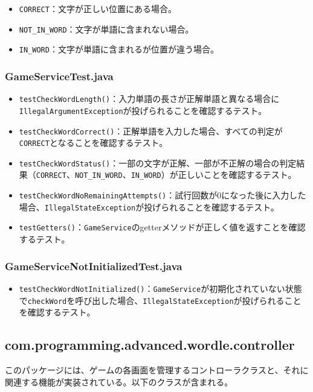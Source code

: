 \documentclass[a4j]{ujarticle}
\begin{document}
\begin{itemize}
  \item \texttt{CORRECT}：文字が正しい位置にある場合。
  \item \texttt{NOT\_IN\_WORD}：文字が単語に含まれない場合。
  \item \texttt{IN\_WORD}：文字が単語に含まれるが位置が違う場合。
\end{itemize}

\subsubsection{GameServiceTest.java}

\begin{itemize}
  \item \texttt{testCheckWordLength()}：入力単語の長さが正解単語と異なる場合に\texttt{IllegalArgumentException}が投げられることを確認するテスト。
  \item \texttt{testCheckWordCorrect()}：正解単語を入力した場合、すべての判定が\texttt{CORRECT}となることを確認するテスト。
  \item \texttt{testCheckWordStatus()}：一部の文字が正解、一部が不正解の場合の判定結果（\texttt{CORRECT}、\texttt{NOT\_IN\_WORD}、\texttt{IN\_WORD}）が正しいことを確認するテスト。
  \item \texttt{testCheckWordNoRemainingAttempts()}：試行回数が0になった後に入力した場合、\texttt{IllegalStateException}が投げられることを確認するテスト。
  \item \texttt{testGetters()}：\texttt{GameService}のgetterメソッドが正しく値を返すことを確認するテスト。
\end{itemize}

\subsubsection{GameServiceNotInitializedTest.java}

\begin{itemize}
  \item \texttt{testCheckWordNotInitialized()}：\texttt{GameService}が初期化されていない状態で\texttt{checkWord}を呼び出した場合、\texttt{IllegalStateException}が投げられることを確認するテスト。
\end{itemize}

\subsection{com.programming.advanced.wordle.controller}
このパッケージには、ゲームの各画面を管理するコントローラクラスと、それに関連する機能が実装されている。以下のクラスが含まれる。
\end{document}
